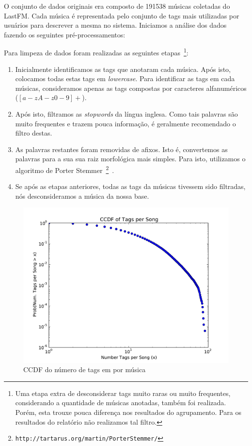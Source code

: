 \documentclass[brazil,a4paper,12pt]{article}
\begin{document}
O conjunto de dados originais era composto de 191538 músicas coletadas do LastFM.
Cada música é representada pelo conjunto de tags mais utilizadas por usuários para
descrever a mesma no sistema. Iniciamos a análise dos dados fazendo os seguintes
pré-processamentos:

Para limpeza de dados foram realizadas as seguintes etapas~\footnote{Uma etapa extra
de desconsiderar tags muito raras ou muito frequentes, considerando a quantidade de
músicas anotadas, também foi realizada. Porém, esta trouxe pouca diferença nos resultados
do agrupamento. Para os resultados do relatório não realizamos tal filtro.}:

\begin{enumerate}
\item Inicialmente identificamos as tags que anotaram cada música. Após
isto, colocamos todas estas tags em {\it lowercase}. Para identificar
as tags em cada músicas, consideramos apenas as tags compostas por
caracteres alfanuméricos ($[a-zA-z0-9]+$).

\item Após isto, filtramos as {\it stopwords} da língua
inglesa. Como tais palavras são muito frequentes e trazem pouca
informação, é geralmente recomendado o filtro destas.

\item As palavras restantes foram removidas de afixos. Isto é, convertemos
as palavras para a sua sua raiz morfológica mais simples. Para isto, 
utilizamos o algoritmo de Porter Stemmer~\footnote{
\texttt{http://tartarus.org/martin/PorterStemmer/}}~\cite{baeza2010modern}.

\item Se após as etapas anteriores, todas as tags da músicas tivessem sido
filtradas, nós desconsideramos a música da nossa base.

\end{enumerate}

\begin{figure}
\centering
\includegraphics[scale=0.6]{tps.pdf}
\caption{CCDF do número de tags em por música}
\label{fig:tps}
\end{figure}
\end{document}

